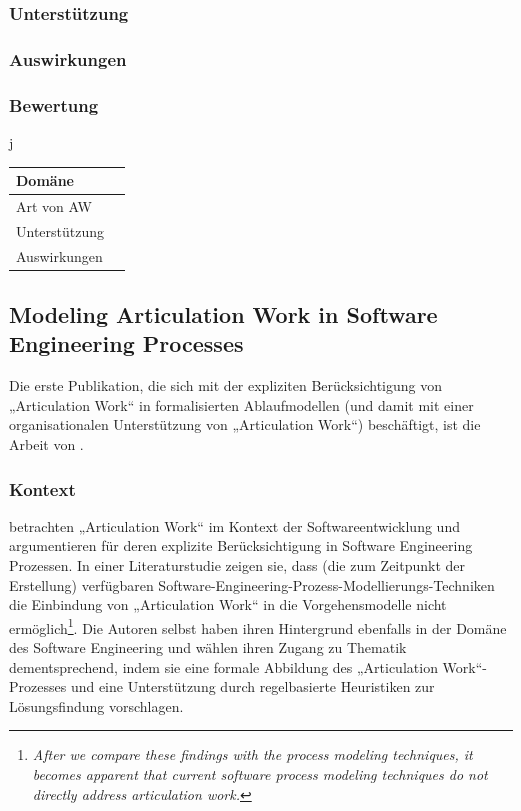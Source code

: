 \subsubsection{Unterstützung}

\subsubsection{Auswirkungen}

\subsubsection{Bewertung}
j
\\[1em]
\begin{tabular}{| p{3cm} | p{10cm} |}
  \hline
  Domäne &  \\ \hline
  Art von AW &  \\ \hline
  Unterstützung &  \\ \hline
  Auswirkungen & \\ \hline
\end{tabular}

\subsection{Modeling Articulation Work in Software Engineering Processes} %
\label{sub:modeling_articulation_work_in_software_engineering_processes}

Die erste Publikation, die sich mit der expliziten Berücksichtigung von „Articulation Work“ in formalisierten Ablaufmodellen (und damit mit einer organisationalen Unterstützung von „Articulation Work“) beschäftigt, ist die Arbeit von \citet{Mi91}.

\subsubsection{Kontext}

\citet{Mi91} betrachten „Articulation Work“ im Kontext der Softwareentwicklung und argumentieren für deren explizite Berücksichtigung in Software Engineering Prozessen. In einer Literaturstudie zeigen sie, dass (die zum Zeitpunkt der Erstellung) verfügbaren Software-Engineering-Prozess-Modellierungs-Techniken die Einbindung von „Articulation Work“ in die Vorgehensmodelle nicht ermöglich\footnote{\emph{After we compare these findings with the process modeling techniques, it becomes apparent that current software process modeling techniques do not directly address articulation work.}\citep[][S. 192]{Mi91}}. Die Autoren selbst haben ihren Hintergrund ebenfalls in der Domäne des Software Engineering und wählen ihren Zugang zu Thematik dementsprechend, indem sie eine formale Abbildung des „Articulation Work“-Prozesses und eine Unterstützung durch regelbasierte Heuristiken zur Lösungsfindung vorschlagen.

